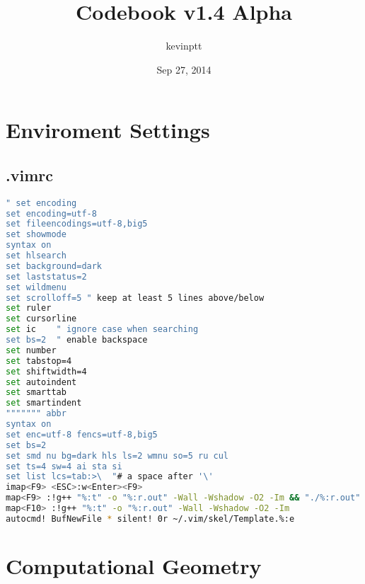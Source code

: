 \documentclass[11pt,twocolumn,a4paper]{article}
\title{Codebook v1.4 Alpha}
\author{kevinptt}
\date{Sep 27, 2014}
\begin{document}
\renewcommand{\contentsname}{Index}
\tableofcontents


\newpage
\section{Enviroment Settings}
\subsection{.vimrc}
\begin{lstlisting}[label=.vimrc,language=bash]
" set encoding
set encoding=utf-8
set fileencodings=utf-8,big5
set showmode
syntax on
set hlsearch
set background=dark
set laststatus=2
set wildmenu
set scrolloff=5 " keep at least 5 lines above/below
set ruler
set cursorline
set ic    " ignore case when searching
set bs=2  " enable backspace
set number
set tabstop=4
set shiftwidth=4
set autoindent
set smarttab
set smartindent
""""""" abbr
syntax on
set enc=utf-8 fencs=utf-8,big5
set bs=2
set smd nu bg=dark hls ls=2 wmnu so=5 ru cul
set ts=4 sw=4 ai sta si
set list lcs=tab:>\  "# a space after '\'
imap<F9> <ESC>:w<Enter><F9>
map<F9> :!g++ "%:t" -o "%:r.out" -Wall -Wshadow -O2 -Im && "./%:r.out"
map<F10> :!g++ "%:t" -o "%:r.out" -Wall -Wshadow -O2 -Im
autocmd! BufNewFile * silent! 0r ~/.vim/skel/Template.%:e
\end{lstlisting}


\newpage
\section{Computational Geometry}
\end{document}
